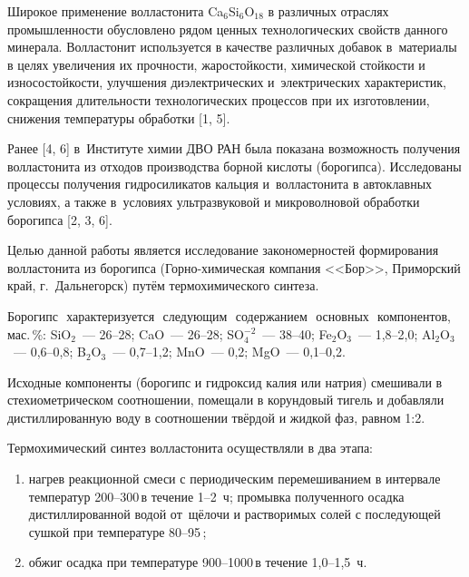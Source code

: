 


\makeProcTitleIINewLine


Широкое применение волластонита Ca$_6$Si$_6$O$_{18}$ в различных отраслях промышленности обусловлено рядом ценных технологических свойств данного минерала. Волластонит используется в качестве различных добавок в~материалы в целях увеличения их прочности, жаростойкости, химической стойкости и износостойкости, улучшения диэлектрических и~электрических характеристик, сокращения длительности технологических процессов при их изготовлении, снижения температуры обработки [1, 5].

Ранее [4, 6] в~Институте химии ДВО РАН была показана возможность получения волластонита из отходов производства борной кислоты (борогипса). Исследованы процессы получения гидросиликатов кальция и~волластонита в автоклавных условиях, а также в~условиях ультразвуковой и микроволновой обработки борогипса [2, 3, 6].



Целью данной работы является исследование закономерностей формирования волластонита из борогипса (Горно-химическая компания <<Бор>>, Приморский край, г.~Дальнегорск) путём термохимического синтеза.

Борогипс\,\, характеризуется\,\, следующим\,\, содержанием\,\, основных\,\, компонентов,\,\, мас.\,\%: SiO$_2$~--- 26--28; CaO~--- 26--28; SO$_4^{-2}$~--- 38--40; Fe$_2$O$_3$~--- 1,8--2,0; Al$_2$O$_3$~--- 0,6--0,8; B$_2$O$_3$~--- 0,7--1,2; MnO~--- 0,2; MgO~--- 0,1--0,2.

Исходные компоненты (борогипс и гидроксид калия или натрия) смешивали в стехиометрическом соотношении, помещали в корундовый тигель и добавляли дистиллированную воду в соотношении твёрдой и жидкой фаз, равном 1:2.\enlargethispage{\baselineskip}

Термохимический синтез волластонита осуществляли в два этапа:
\begin{enumerate}[noitemsep]\vspace{-8pt}
  \item нагрев реакционной смеси с периодическим перемешиванием в интервале температур 200--300\,\dgc в течение 1--2~ч; промывка полученного осадка дистиллированной водой от~щёлочи и растворимых солей с последующей сушкой при температуре 80--95\,\dgc;
    \item обжиг осадка при температуре 900--1000\,\dgc в течение 1,0--1,5~ч.
\end{enumerate}
 \vspace{-8pt}


